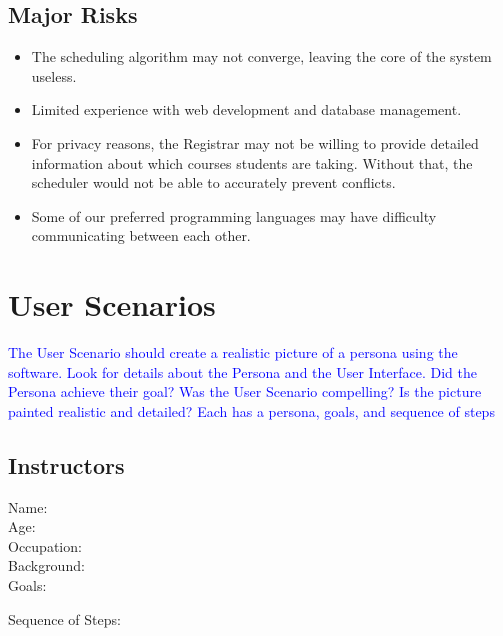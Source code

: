 \documentclass[11pt]{article}
\begin{document}
\subsection{Major Risks} %

\begin{itemize}
\item The scheduling algorithm may not converge, leaving the core of the system useless.
\item Limited experience with web development and database management.
\item For privacy reasons, the Registrar may not be willing to provide detailed information about which courses students are taking. Without that, the scheduler would not be able to accurately prevent conflicts.
\item Some of our preferred programming languages may have difficulty communicating between each other. %
\end{itemize}


\section{User Scenarios}  %
\textcolor{blue}{The User Scenario should create a realistic picture of a persona using the software.  
Look for details about the Persona and the User Interface.  
Did the Persona achieve their goal?  
Was the User Scenario compelling?  
Is the picture painted realistic and detailed?
Each has a persona, goals, and sequence of steps}
\subsection{Instructors} %
\begin{description}
\item[Name:]
\item[Age:]
\item[Occupation:]
\item[Background:]

\item[Goals:]
\begin{enumerate}
\end{enumerate}

\item[Sequence of Steps:]
\end{description}
\end{document}
